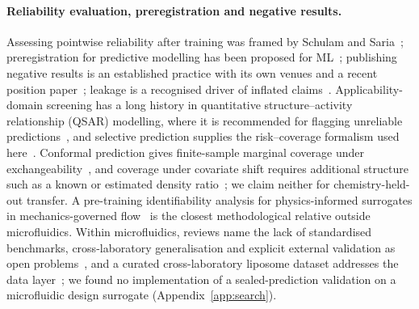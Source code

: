 \documentclass[11pt,a4paper]{article}
\begin{document}
\paragraph{Reliability evaluation, preregistration and negative results.}
Assessing pointwise reliability after training was framed by Schulam and
Saria~\cite{schulam2019}; preregistration for predictive modelling has been
proposed for ML~\cite{hofman2023}; publishing negative results is an
established practice with its own venues and a recent position
paper~\cite{karl2024}; leakage is a recognised driver of inflated
claims~\cite{kapoor2023}. Applicability-domain screening has a long history
in quantitative structure--activity relationship (QSAR) modelling, where it is recommended for flagging unreliable
predictions~\cite{tropsha2003,netzeva2005,sahigara2012}, and selective
prediction supplies the risk--coverage formalism used
here~\cite{elyaniv2010}. Conformal prediction gives finite-sample marginal
coverage under exchangeability~\cite{vovk2005,romano2019}, and coverage under
covariate shift requires additional structure such as a known or estimated
density ratio~\cite{tibshirani2019,barber2023}; we claim neither for
chemistry-held-out transfer. A pre-training identifiability analysis for physics-informed surrogates
in mechanics-governed flow~\cite{cieslak2026} is the closest methodological
relative outside microfluidics. Within microfluidics, reviews name the lack of
standardised benchmarks, cross-laboratory generalisation and explicit
external validation as open problems~\cite{labchip2025review,das2025,
delgiudice2026}, and a curated cross-laboratory liposome dataset addresses the
data layer~\cite{smartmicrofluidics2026}; we found no implementation of a
sealed-prediction validation on a microfluidic design surrogate
(Appendix~\ref{app:search}).
\end{document}
